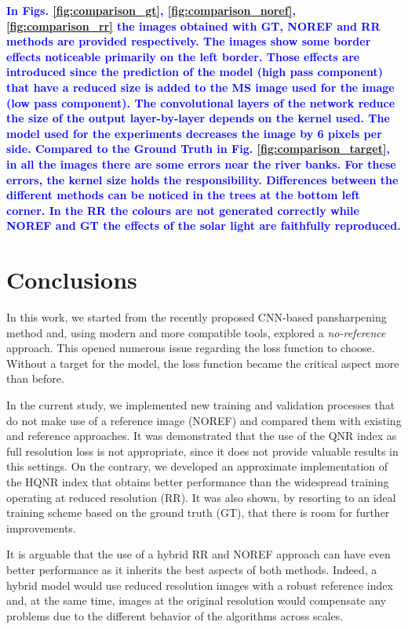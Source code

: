 \documentclass[12pt]{report}
\newcommand{\bb}[1]{\textcolor{blue}{\textbf{#1}}}
\begin{document}
\bb{In Figs. \ref{fig:comparison_gt}, \ref{fig:comparison_noref}, \ref{fig:comparison_rr} the images obtained with GT, NOREF and RR methods are provided respectively.
The images show some border effects noticeable primarily on the left border. Those effects are introduced since the prediction of the model (high pass component) that have a reduced size is added to the MS image used for the image (low pass component). The convolutional layers of the network reduce the size of the output layer-by-layer depends on the kernel used. The model used for the experiments decreases the image by 6 pixels per side.
Compared to the Ground Truth in Fig. \ref{fig:comparison_target}, in all the images there are some errors near the river banks. For these errors, the kernel size holds the responsibility.
Differences between the different methods can be noticed in the trees at the bottom left corner. 
In the RR the colours are not generated correctly while NOREF and GT the effects of the solar light are faithfully reproduced.}

\chapter*{Conclusions}
In this work, we started from the recently proposed \cite{pnn2} CNN-based pansharpening method and, using modern and more compatible tools, explored a \textit{no-reference} approach.
This opened numerous issue regarding the loss function to choose.
Without a target for the model, the loss function became the critical aspect more than before.

In the current study, we implemented new training and validation processes that do not make use of a reference image (NOREF) and compared them with existing and reference approaches. 
It was demonstrated that the use of the QNR index as full resolution loss is not appropriate, since it does not provide valuable results in this settings. On the contrary, we developed an approximate implementation of the HQNR index that obtains better performance than the widespread training operating at reduced resolution (RR). It was also shown, by resorting to an ideal training scheme based on the ground truth (GT), that there is room for further improvements. 

It is arguable that the use of a hybrid RR and NOREF approach can have even better performance as it inherits the best aspects of both methods.
Indeed, a hybrid model would use reduced resolution images with a robust reference index
and, at the same time, images at the original resolution would compensate any problems due to the different behavior of the algorithms across scales.
\end{document}

